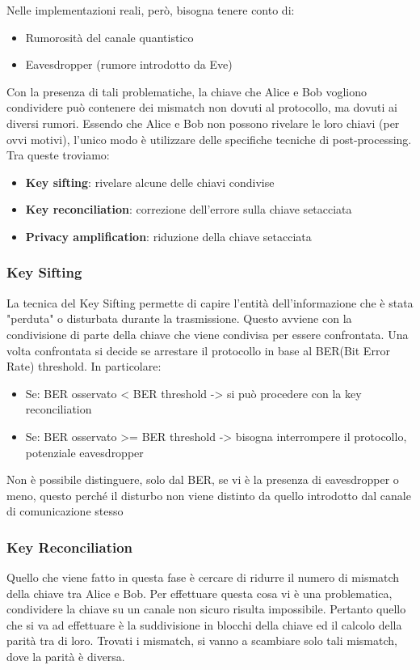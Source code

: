Nelle implementazioni reali, però, bisogna tenere conto di:
\begin{itemize}
    \item Rumorosità del canale quantistico
    \item Eavesdropper (rumore introdotto da Eve)
\end{itemize}

Con la presenza di tali problematiche, la chiave che Alice e Bob vogliono condividere può contenere dei mismatch non dovuti al protocollo, ma dovuti ai diversi rumori. Essendo che Alice e Bob non possono rivelare le loro chiavi (per ovvi motivi), l'unico modo è utilizzare delle specifiche tecniche di post-processing. Tra queste troviamo:
\begin{itemize}
    \item \textbf{Key sifting}: rivelare alcune delle chiavi condivise
    \item \textbf{Key reconciliation}: correzione dell'errore sulla chiave setacciata
    \item \textbf{Privacy amplification}: riduzione della chiave setacciata
\end{itemize}

\subsubsection{Key Sifting}
La tecnica del Key Sifting permette di capire l'entità dell'informazione che è stata "perduta" o disturbata durante la trasmissione. Questo avviene con la condivisione di parte della chiave che viene condivisa per essere confrontata. Una volta confrontata si decide se arrestare il protocollo in base al BER(Bit Error Rate) threshold. In particolare:
\begin{itemize}
    \item Se: BER osservato < BER threshold -> si può procedere con la key reconciliation
    \item Se: BER osservato >= BER threshold -> bisogna interrompere il protocollo, potenziale eavesdropper
\end{itemize}

Non è possibile distinguere, solo dal BER, se vi è la presenza di eavesdropper o meno, questo perché il disturbo non viene distinto da quello introdotto dal canale di comunicazione stesso

\subsubsection{Key Reconciliation}
Quello che viene fatto in questa fase è cercare di ridurre il numero di mismatch della chiave tra Alice e Bob. Per effettuare questa cosa vi è una problematica, condividere la chiave su un canale non sicuro risulta impossibile. Pertanto quello che si va ad effettuare è la suddivisione in blocchi della chiave ed il calcolo della parità tra di loro. Trovati i mismatch, si vanno a scambiare solo tali mismatch, dove la parità è diversa. 

